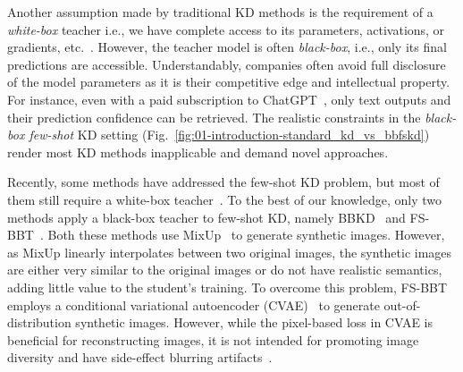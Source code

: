 \documentclass[12pt, a4paper, twoside]{book}
\numberwithin{equation}{chapter}
\theoremstyle{plain}
\theoremstyle{definition}
\theoremstyle{remark}
\newenvironment{foldable}{}{}
\newcommand*{\ie}{i.e.}
\newcommand*{\etc}{etc.}
\begin{document}
\begin{foldable}
  Another assumption made by traditional \ac{KD} methods is the requirement of a \textit{white-box} teacher \ie, we have complete access to its parameters, activations, or gradients, \etc~\cite{romero2015fitnets,yim2017gift,kimura2018few,chen2019data}.
  However, the teacher model is often \textit{black-box}, \ie, only its final predictions are accessible.
  Understandably, companies often avoid full disclosure of the model parameters as it is their competitive edge and intellectual property.
  For instance, even with a paid subscription to ChatGPT~\cite{openai2022introducing}, only text outputs and their prediction confidence can be retrieved.
  The realistic constraints in the \textit{black-box few-shot} \ac{KD} setting (Fig.~\ref{fig:01-introduction-standard_kd_vs_bbfskd}) render most \ac{KD} methods inapplicable and demand novel approaches.
\end{foldable}

\begin{foldable}
  Recently, some methods have addressed the few-shot \ac{KD} problem, but most of them still require a white-box teacher~\cite{kimura2018few,kong2020learning}.
  To the best of our knowledge, only two methods apply a black-box teacher to few-shot \ac{KD}, namely BBKD~\cite{wang2020neural} and FS-BBT~\cite{nguyen2022black}.
  Both these methods use MixUp~\cite{zhang2018mixup} to generate synthetic images.
  However, as MixUp linearly interpolates between two original images, the synthetic images are either very similar to the original images or do not have realistic semantics, adding little value to the student's training.
  To overcome this problem, FS-BBT employs a conditional variational autoencoder (CVAE)~\cite{sohn2015learning} to generate out-of-distribution synthetic images.
  However, while the pixel-based loss in CVAE is beneficial for reconstructing images, it is not intended for promoting image diversity and have side-effect blurring artifacts~\cite{bond2021deep}.
\end{foldable}
\end{document}
